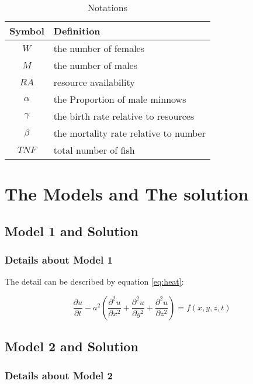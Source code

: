 \documentclass[12pt]{article}  %
\begin{document}
\begin{table}[!htbp]
\begin{center}
\caption{Notations}
\begin{tabular}{cl}
	\toprule
	\multicolumn{1}{m{3cm}}{\centering Symbol}
	&\multicolumn{1}{m{12cm}}{\centering Definition}\\
	\midrule
	$W$&the number of females\\
	$M$&the number of males\\
	$RA$&resource availability\\
	$\alpha$ &the Proportion of male minnows\\
	$\gamma$ &the birth rate relative to resources\\
	$\beta$ &the mortality rate relative to number\\
	$TNF$ &total number of fish\\
	\bottomrule
\end{tabular}\label{tb:notation}
\end{center}
\end{table}

\section{The Models and The solution}
\subsection{Model 1 and Solution}
\subsubsection{Details about Model 1}
The detail can be described by equation \eqref{eq:heat}:

\begin{equation}\label{eq:heat}
\frac{\partial u}{\partial t} - a^2 \left( \frac{\partial^2 u}{\partial x^2} + \frac{\partial^2 u}{\partial y^2} + \frac{\partial^2 u}{\partial z^2} \right) = f(x, y, z, t)
\end{equation}

\subsection{Model 2 and Solution}
\subsubsection{Details about Model 2}
\end{document}
